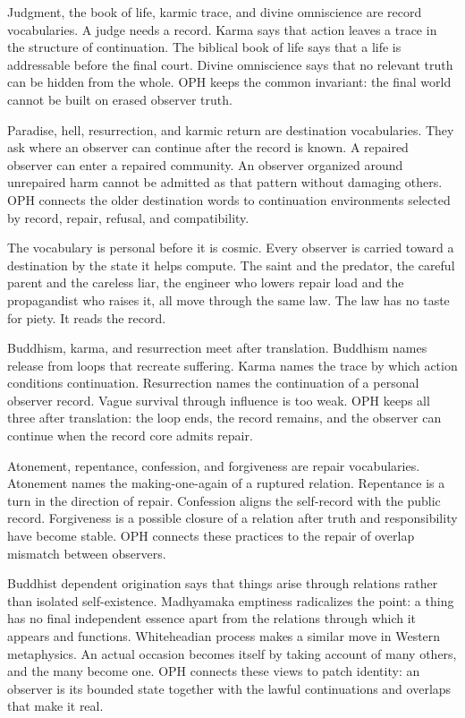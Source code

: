 \documentclass[11pt]{article}
\theoremstyle{remark}
\theoremstyle{plain}
\begin{document}
Judgment, the book of life, karmic trace, and divine omniscience are record
vocabularies. A judge needs a record. Karma says that action leaves a trace in
the structure of continuation. The biblical book of life says that a life is
addressable before the final court. Divine omniscience says that no relevant
truth can be hidden from the whole. OPH keeps the common invariant: the final
world cannot be built on erased observer truth.

Paradise, hell, resurrection, and karmic return are destination vocabularies.
They ask where an observer can continue after the record is known. A repaired
observer can enter a repaired community. An observer organized around unrepaired
harm cannot be admitted as that pattern without damaging others. OPH connects
the older destination words to continuation environments selected by record,
repair, refusal, and compatibility.

The vocabulary is personal before it is cosmic. Every observer is carried
toward a destination by the state it helps compute. The saint and the predator,
the careful parent and the careless liar, the engineer who lowers repair load
and the propagandist who raises it, all move through the same law. The law has
no taste for piety. It reads the record.

Buddhism, karma, and resurrection meet after translation. Buddhism names
release from loops that recreate suffering. Karma names the trace by which
action conditions continuation. Resurrection names the continuation of a
personal observer record. Vague survival through influence is too weak. OPH
keeps all three after translation: the loop ends, the record remains, and the
observer can continue when the record core admits repair.

Atonement, repentance, confession, and forgiveness are repair vocabularies.
Atonement names the making-one-again of a ruptured relation. Repentance is a
turn in the direction of repair. Confession aligns the self-record with the
public record. Forgiveness is a possible closure of a relation after truth and
responsibility have become stable. OPH connects these practices to the repair of
overlap mismatch between observers.

Buddhist dependent origination says that things arise through relations rather
than isolated self-existence. Madhyamaka emptiness radicalizes the point: a thing
has no final independent essence apart from the relations through which it
appears and functions. Whiteheadian process makes a similar move in Western
metaphysics. An actual occasion becomes itself by taking account of many others,
and the many become one. OPH connects these views to patch identity: an observer
is its bounded state together with the lawful continuations and overlaps that
make it real.
\end{document}
